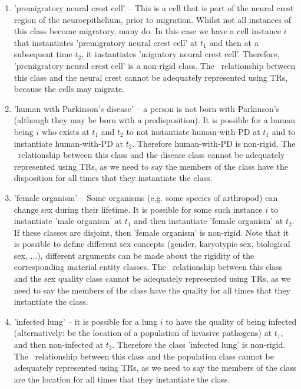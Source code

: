 \documentclass{bioinfo}
\def\partOf{\pr{part\_of}}
\begin{document}
\begin{enumerate}

\item 'premigratory neural crest cell' -- This is a cell that is part
  of the neural crest region of the neuroepithelium, prior to
  migration. Whilst not all instances of this class become migratory,
  many do. In this case we have a cell instance $i$ that instantiates
  'premigratory neural crest cell' at $t_1$ and then at a subsequent
  time $t_2$, it instantiates 'migratory neural crest
  cell'. Therefore, 'premigratory neural crest cell' is a non-rigid
  class. The \partOf\ relationship between this class and the neural
  crest cannot be adequately represented using TRs, because the cells
  may migrate.

\item 'human with Parkinson's disease' -- a person is not born with
  Parkinson's (although they may be born with a predisposition). It is
  possible for a human being $i$ who exists at $t_1$ and $t_2$ to not
  instantiate human-with-PD at $t_1$ and to instantiate human-with-PD
  at $t_2$. Therefore human-with-PD is non-rigid. The
  \ relationship between this class and the
  disease class cannot be adequately represented using TRs, as we need
  to say the members of the class have the disposition for all times
  that they instantiate the class.

\item 'female organism' -- Some organisms (e.g. some species of
  arthropod) can change sex during their lifetime. It is possible for
  some such instance $i$ to instantiate 'male organism' at $t_1$ and
  then instantiate 'female organism' at $t_2$. If these classes are
  disjoint, then 'female organism' is non-rigid. Note that it is
  possible to define different sex concepts (gender, karyotypic sex,
  biological sex, ...), different arguments can be made about the
  rigidity of the corresponding material entity classes.  The
  \ relationship between this class and the sex
  quality class cannot be adequately represented using TRs, as we need
  to say the members of the class have the quality for all times
  that they instantiate the class.


\item 'infected lung' -- it is possible for a lung $i$ to have the
  quality of being infected (alternatively: be the location of a
  population of invasive pathogens) at $t_1$, and then non-infected at
  $t_2$. Therefore the class 'infected lung' is non-rigid.  The
  \ relationship between this class and the population
  class cannot be adequately represented using TRs, as we need to say
  the members of the class are the location for all times that they
  instantiate the class.



\end{enumerate}
\end{document}
